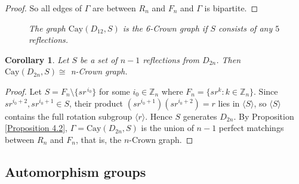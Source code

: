 \documentclass[12pt,reqno,a4paper]{amsart}
\theoremstyle{definition}
\newtheorem{corr}[defn]{Corollary}
\begin{document}
\begin{proof}
So all edges of $\Gamma$ are between $R_{n}$ and $F_{n}$ and $\Gamma$ is bipartite.
\medskip
 \end{proof}

\begin{figure}[h]
\centering
{}

\caption{\em The graph $\mathrm{Cay}(D_{12},S)$ is the 6-Crown graph if $S$ consists of any $5$ reflections.}
\end{figure}
\begin{corr}\label{Corollary 4.5}
{\em Let
$S$ be a set of $n-1$ reflections from $D_{2n}$. Then $\mathrm{Cay}(D_{2n}, S)\cong$ n-Crown graph.
}
\end{corr}

\begin{proof}
Let
$S = F_{n}\setminus\{sr^{\,i_0}\}$ for some $i_{0}\in \mathbb{Z}_{n}$ where $F_{n}=\{sr^k: k\in\mathbb Z_n\}$.
Since $sr^{i_0+2},sr^{i_0+1}\in S$, their product $(sr^{i_0+1})(sr^{i_0+2})=r$ lies in $\langle S\rangle$, so $\langle S\rangle$ contains the full rotation subgroup $\langle r\rangle$. Hence $S$ generates $D_{2n}$.
By Proposition \ref{Proposition 4.2}, $\Gamma=\mathrm{Cay}(D_{2n}, S)$ is the union of $n-1$ perfect matchings between $R_{n}$ and $F_{n}$, that is, the $n$-Crown graph.
 \end{proof}

\subsection{Automorphism groups}
\end{document}
